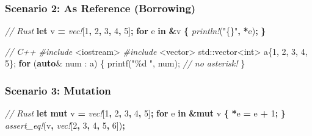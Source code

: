 \documentclass[
]{book}
\newenvironment{Shaded}{\begin{snugshade}}{\end{snugshade}}
\newcommand{\BuiltInTok}[1]{#1}
\newcommand{\CommentTok}[1]{\textcolor[rgb]{0.56,0.35,0.01}{\textit{#1}}}
\newcommand{\ControlFlowTok}[1]{\textcolor[rgb]{0.13,0.29,0.53}{\textbf{#1}}}
\newcommand{\DataTypeTok}[1]{\textcolor[rgb]{0.13,0.29,0.53}{#1}}
\newcommand{\DecValTok}[1]{\textcolor[rgb]{0.00,0.00,0.81}{#1}}
\newcommand{\ImportTok}[1]{#1}
\newcommand{\KeywordTok}[1]{\textcolor[rgb]{0.13,0.29,0.53}{\textbf{#1}}}
\newcommand{\NormalTok}[1]{#1}
\newcommand{\OperatorTok}[1]{\textcolor[rgb]{0.81,0.36,0.00}{\textbf{#1}}}
\newcommand{\PreprocessorTok}[1]{\textcolor[rgb]{0.56,0.35,0.01}{\textit{#1}}}
\newcommand{\SpecialCharTok}[1]{\textcolor[rgb]{0.00,0.00,0.00}{#1}}
\newcommand{\StringTok}[1]{\textcolor[rgb]{0.31,0.60,0.02}{#1}}
\begin{document}
\hypertarget{scenario-2-as-reference-borrowing}{%
\subsubsection{Scenario 2: As Reference (Borrowing)}\label{scenario-2-as-reference-borrowing}}

\begin{Shaded}
\begin{Highlighting}[]
\CommentTok{// Rust}
\KeywordTok{let}\NormalTok{ v }\OperatorTok{=} \PreprocessorTok{vec!}\NormalTok{[}\DecValTok{1}\OperatorTok{,} \DecValTok{2}\OperatorTok{,} \DecValTok{3}\OperatorTok{,} \DecValTok{4}\OperatorTok{,} \DecValTok{5}\NormalTok{]}\OperatorTok{;}
\KeywordTok{for}\NormalTok{ e }\KeywordTok{in} \OperatorTok{\&}\NormalTok{v }\OperatorTok{\{}
    \PreprocessorTok{println!}\NormalTok{(}\StringTok{"\{\}"}\OperatorTok{,} \OperatorTok{*}\NormalTok{e)}\OperatorTok{;}
\OperatorTok{\}}
\end{Highlighting}
\end{Shaded}

\begin{Shaded}
\begin{Highlighting}[]
\CommentTok{// C++}
\PreprocessorTok{\#include }\ImportTok{\textless{}iostream\textgreater{}}
\PreprocessorTok{\#include }\ImportTok{\textless{}vector\textgreater{}}
\BuiltInTok{std::}\NormalTok{vector\textless{}}\DataTypeTok{int}\NormalTok{\textgreater{} a\{}\DecValTok{1}\NormalTok{, }\DecValTok{2}\NormalTok{, }\DecValTok{3}\NormalTok{, }\DecValTok{4}\NormalTok{, }\DecValTok{5}\NormalTok{\};}
\ControlFlowTok{for}\NormalTok{ (}\KeywordTok{auto}\NormalTok{\& num : a)}
\NormalTok{\{}
\NormalTok{    printf(}\StringTok{"}\SpecialCharTok{\%d}\StringTok{ "}\NormalTok{, num); }\CommentTok{// no asterisk!}
\NormalTok{\}}
\end{Highlighting}
\end{Shaded}

\hypertarget{scenario-3-mutation}{%
\subsubsection{Scenario 3: Mutation}\label{scenario-3-mutation}}

\begin{Shaded}
\begin{Highlighting}[]
\CommentTok{// Rust}
\KeywordTok{let} \KeywordTok{mut}\NormalTok{ v }\OperatorTok{=} \PreprocessorTok{vec!}\NormalTok{[}\DecValTok{1}\OperatorTok{,} \DecValTok{2}\OperatorTok{,} \DecValTok{3}\OperatorTok{,} \DecValTok{4}\OperatorTok{,} \DecValTok{5}\NormalTok{]}\OperatorTok{;}
\KeywordTok{for}\NormalTok{ e }\KeywordTok{in} \OperatorTok{\&}\KeywordTok{mut}\NormalTok{ v }\OperatorTok{\{}
    \OperatorTok{*}\NormalTok{e }\OperatorTok{=}\NormalTok{ e }\OperatorTok{+} \DecValTok{1}\OperatorTok{;}
\OperatorTok{\}}
\PreprocessorTok{assert\_eq!}\NormalTok{(v}\OperatorTok{,} \PreprocessorTok{vec!}\NormalTok{[}\DecValTok{2}\OperatorTok{,} \DecValTok{3}\OperatorTok{,} \DecValTok{4}\OperatorTok{,} \DecValTok{5}\OperatorTok{,} \DecValTok{6}\NormalTok{])}\OperatorTok{;}
\end{Highlighting}
\end{Shaded}
\end{document}
